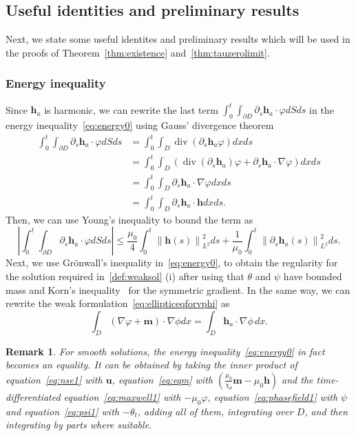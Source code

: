 \documentclass[10pt,letterpaper,twoside]{amsart}
\newtheorem{remark}[lemma]{Remark}
\theoremstyle{definition}{\newtheorem{definition}[lemma]{Definition}}
\theoremstyle{note}{\newtheorem{claim}{Claim}[section]
\newtheorem*{claim*}{Claim}}
\numberwithin{equation}{section}
\newcommand{\dom}{D}
\newcommand{\norm}[1]{\left\| #1 \right\|}
\newcommand{\Grad}{\nabla}
\newcommand{\Div}{\operatorname{div}}
\newcommand{\bu}{\mathbf{u}}
\newcommand{\bm}{\mathbf{m}}
\newcommand{\bh}{\mathbf{h}}
\begin{document}
\subsection{Useful identities and preliminary results}
Next, we state some useful identites and preliminary results which will be used in the proofs of Theorem~\ref{thm:existence} and~\ref{thm:tauzerolimit}.
\subsubsection{Energy inequality}
	Since $\bh_a$ is harmonic, we can rewrite the last term $\int_0^t\int_{\partial\dom} \partial_s \bh_a \cdot\varphi dS ds$ in the energy inequality~\eqref{eq:energy0} using Gauss' divergence theorem
	\begin{align*}
		\int_0^t\int_{\partial\dom} \partial_s \bh_a \cdot\varphi dS ds& = \int_0^t \int_{\dom} \Div (\partial_s \bh_a \varphi) dx ds\\
		&= \int_0^t\int_{\dom} (\Div(\partial_s \bh_a) \varphi + \partial_s \bh_a\cdot\Grad \varphi )dx ds \\
		&= \int_0^t \int_{\dom} \partial_s \bh_a \cdot\Grad\varphi dx ds \\
		&= \int_0^t\int_{\dom}\partial_s \bh_a \cdot\bh dx ds.
	\end{align*}
Then, we can use Young's inequality to bound the term as
\begin{equation*}
	\left| 	\int_0^t\int_{\partial\dom} \partial_s \bh_a \cdot\varphi dS ds  \right|\leq \frac{\mu_0}{4}\int_0^t\norm{\bh(s)}_{L^2}^2 ds +\frac{1}{\mu_0}\int_0^t \norm{\partial_s\bh_a(s)}_{L^2}^2 ds.
\end{equation*}
Next, we use
 Gr\"onwall's inequality in~\eqref{eq:energy0}, to obtain the regularity for the solution required in~\ref{def:weaksol} (i) after using that $\theta$ and $\psi$ have bounded mass and Korn's inequality~\cite{Korn1909} for the symmetric gradient. In the same way, we can rewrite the weak formulation~\eqref{eq:ellipticeqforvphi} as
 \begin{equation}
 	\label{eq:ellipticforvphi2}
 		\int_{\dom} (\Grad\varphi+\bm) \cdot\Grad\phi dx =\int_{ \dom} \bh_a\cdot \Grad \phi\, dx.
 \end{equation}

\begin{remark}\label{rem:energysmoothsol}
	For smooth solutions, the energy inequality~\eqref{eq:energy0} in fact becomes an equality. It can be obtained by taking the inner product of equation~\eqref{eq:nse1} with $\bu$, equation~\eqref{eq:eqm} with $(\frac{\mu_0}{\chi_\theta}\bm-\mu_0\bh)$ and the time-differentiated equation~\eqref{eq:maxwell1} with $-\mu_0\varphi$, equation~\eqref{eq:phasefield1} with $\psi$ and equation~\eqref{eq:psi1} with $-\theta_t$, adding all of them, integrating over $\dom$, and then integrating by parts where suitable.
\end{remark}
\end{document}
